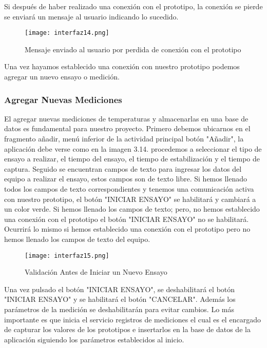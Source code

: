 \par \noindent
Si después de haber realizado una conexión con el prototipo, la conexión se pierde se enviará un mensaje al usuario indicando lo sucedido.

\begin{figure}[H]
	\centering
	\texttt{[image: interfaz14.png]}
	\caption{Mensaje enviado al usuario por perdida de conexión con el prototipo}
\end{figure}

\par \noindent
Una vez hayamos establecido una conexión con nuestro prototipo podemos agregar un nuevo ensayo o medición.

\subsubsection{Agregar Nuevas Mediciones}

\par 
El agregar nuevas mediciones de temperaturas y almacenarlas en una base de datos es fundamental para nuestro proyecto. Primero debemos ubicarnos en el fragmento añadir, menú inferior de la actividad principal botón "Añadir", la aplicación debe verse como en la imagen 3.14. procedemos a seleccionar el tipo de ensayo a realizar, el tiempo del ensayo, el tiempo de estabilización y el tiempo de captura. Seguido se encuentran campos de texto para ingresar los datos del equipo a realizar el ensayo, estos campos son de texto libre. Si hemos llenado todos los campos de texto correspondientes y tenemos una comunicación activa con nuestro prototipo, el botón "INICIAR ENSAYO" se habilitará y cambiará a un color verde. Si hemos llenado los campos de texto; pero, no hemos establecido una conexión con el prototipo el botón "INICIAR ENSAYO" no se habilitará. Ocurrirá lo mismo si hemos establecido una conexión con el prototipo pero no hemos llenado los campos de texto del equipo.

\begin{figure}[H]
	\centering
	\texttt{[image: interfaz15.png]}
	\caption{Validación Antes de Iniciar un Nuevo Ensayo}
\end{figure}

\par \noindent 
Una vez pulsado el botón "INICIAR ENSAYO", se deshabilitará el botón "INICIAR ENSAYO" y se habilitará el botón "CANCELAR". Además los parámetros de la medición se deshabilitarán para evitar cambios. Lo más importante es que inicia el servicio registros de mediciones el cual es el encargado de capturar los valores de los prototipos e insertarlos en la base de datos de la aplicación siguiendo los parámetros establecidos al inicio. 

